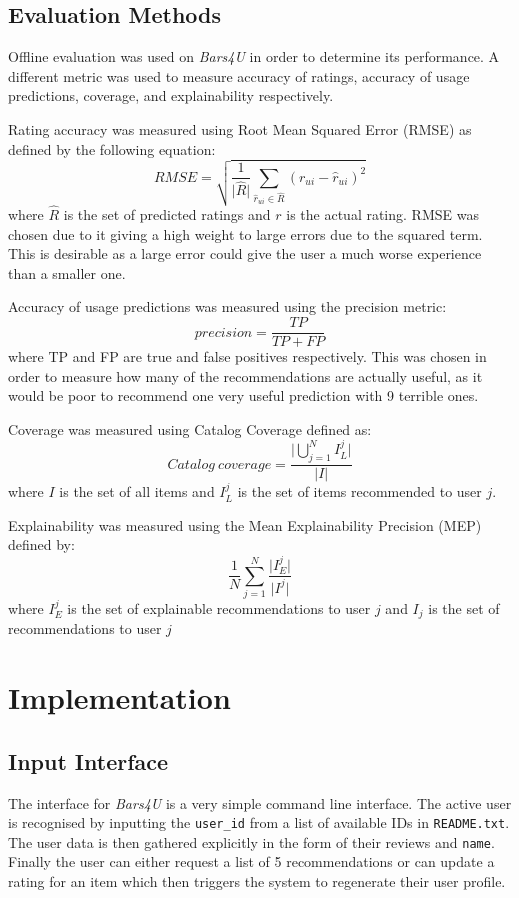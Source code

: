 \documentclass[conference]{IEEEtran}
\begin{document}
\subsection{Evaluation Methods}
Offline evaluation was used on \textit{Bars4U} in order to determine its performance. A different metric was used to measure accuracy of ratings, accuracy of usage predictions, coverage, and explainability respectively.
\par
Rating accuracy was measured using Root Mean Squared Error (RMSE) as defined by the following equation:
\begin{equation}
    RMSE=\sqrt{\frac{1}{\lvert\hat{R}\rvert}\sum_{\hat{r}_{ui}\in\hat{R}}(r_{ui}-\hat{r}_{ui})^{2}}
\end{equation}
where $\hat{R}$ is the set of predicted ratings and $r$ is the actual rating. RMSE was chosen due to it giving a high weight to large errors due to the squared term. This is desirable as a large error could give the user a much worse experience than a smaller one.
\par
Accuracy of usage predictions was measured using the precision metric:
\begin{equation}
    precision=\frac{TP}{TP+FP}
\end{equation}
where TP and FP are true and false positives respectively. This was chosen in order to measure how many of the recommendations are actually useful, as it would be poor to recommend one very useful prediction with 9 terrible ones.
\par
Coverage was measured using Catalog Coverage defined as:
\begin{equation}
    Catalog\ coverage=
    \frac
    {\lvert\bigcup_{j=1}^{N}I_{L}^{j}\rvert}
    {\lvert I \rvert}
\end{equation}
where $I$ is the set of all items and $I_{L}^{j}$ is the set of items recommended to user $j$.
\par
Explainability was measured using the Mean Explainability Precision (MEP)\cite{b14} defined by:
\begin{equation}
    \frac{1}{N}
    \sum_{j=1}^{N}
    \frac{\lvert I_{E}^{j}\rvert}{\lvert I^{j}\rvert}
\end{equation}
where $I_{E}^{j}$ is the set of explainable recommendations to user $j$ and $I_{j}$ is the set of recommendations to user $j$
\section{Implementation}
\subsection{Input Interface}
The interface for \textit{Bars4U} is a very simple command line interface. The active user is recognised by inputting the \texttt{user\_id} from a list of available IDs in \texttt{README.txt}. The user data is then gathered explicitly in the form of their reviews and \texttt{name}. Finally the user can either request a list of 5 recommendations or can update a rating for an item which then triggers the system to regenerate their user profile.
\end{document}
